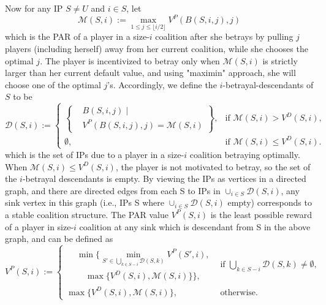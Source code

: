 \documentclass[sigconf,anonymous]{aamas}
\begin{document}
Now for any IP $S \neq U$ and $i \in S$, let 
\begin{equation}
 \mathcal{M}(S, i) := \max_{1\leq j \leq \lfloor i/2 \rfloor} V^P (B(S, i, j), j)
\end{equation}
which is the PAR of a player in a size-$i$ coalition after she betrays by pulling $j$ players (including herself) away from her current coalition, while she chooses the optimal $j$. The player is incentivized to betray only when $\mathcal{M}(S, i)$ is strictly larger than her current default value, and using "maximin" approach, she will choose one of the optimal $j$'s. Accordingly, we define the $i$-betrayal-descendants of $S$ to be 
\begin{equation}
	\mathcal{D}(S, i) := 
	\begin{cases}
		\left\{
		\begin{aligned}
			&B(S,i,j) \;\big|\; \\
			&V^P(B(S,i,j), j) = \mathcal{M}(S,i)
		\end{aligned}
		\right\}, 
		& \text{if } \mathcal{M}(S,i) > V^D(S,i), \\[6pt]
		\emptyset, 
		& \text{if } \mathcal{M}(S,i) \leq V^D(S,i).
	\end{cases}
\end{equation}
which is the set of IPs due to a player in a size-$i$ coalition betraying optimally. When $\mathcal{M}(S, i) \leq V^D(S, i)$, the player is not motivated to betray, so the set of the $i$-betrayal descendants is empty. By viewing the IPs as vertices in a directed graph, and there are directed edges from each S to IPs in $\cup_{i\in S} \mathcal{D}(S, i)$, any sink vertex in this graph (i.e., IPs S where $\cup_{i\in S} \mathcal{D}(S, i)$ empty) corresponds to a stable coalition structure. The PAR value $V^P (S, i)$ is the least possible reward of a player in size-$i$ coalition at any sink which is descendant from S in the above graph, and can be defined as 
\begin{equation}
	V^P(S,i) := 
	\begin{cases}
		\begin{aligned}
			& \min \Biggl\{ 
			\min_{S' \in \bigcup_{k \in S-i} \mathcal{D}(S,k)} V^P(S',i), \\
			& \quad \max \{ V^D(S,i), \mathcal{M}(S,i) \} 
			\Biggr\},
		\end{aligned}
		& \text{if } \bigcup_{k \in S-i} \mathcal{D}(S,k) \neq \emptyset, \\[10pt]
		\max \{ V^D(S,i), \mathcal{M}(S,i) \}, 
		& \text{otherwise.}
	\end{cases}
\end{equation}
\end{document}
